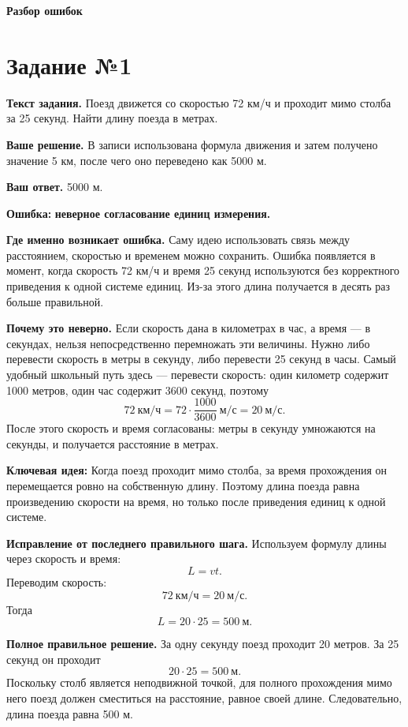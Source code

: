 \documentclass[12pt,a4paper]{article}
\newcommand{\errorlabel}[1]{\textcolor{errred}{\textbf{Ошибка:}} \textbf{#1}}
\newcommand{\keyidea}[1]{\textcolor{ideablue}{\textbf{Ключевая идея:}} #1}
\begin{document}
\newpage
\vspace*{0.35\textheight}
\begin{center}
{\LARGE\bfseries Разбор ошибок}
\end{center}
\newpage

\label{task:1}
\section*{Задание №1}
\textbf{Текст задания.} Поезд движется со скоростью 72 км/ч и проходит мимо столба за 25 секунд. Найти длину поезда в метрах.

\textbf{Ваше решение.} В записи использована формула движения и затем получено значение 5 км, после чего оно переведено как 5000 м.

\textbf{Ваш ответ.} 5000 м.

\errorlabel{неверное согласование единиц измерения.}

\textbf{Где именно возникает ошибка.} Саму идею использовать связь между расстоянием, скоростью и временем можно сохранить. Ошибка появляется в момент, когда скорость 72 км/ч и время 25 секунд используются без корректного приведения к одной системе единиц. Из-за этого длина получается в десять раз больше правильной.

\textbf{Почему это неверно.} Если скорость дана в километрах в час, а время --- в секундах, нельзя непосредственно перемножать эти величины. Нужно либо перевести скорость в метры в секунду, либо перевести 25 секунд в часы. Самый удобный школьный путь здесь --- перевести скорость: один километр содержит 1000 метров, один час содержит 3600 секунд, поэтому
\[
72\ \text{км/ч}=72\cdot\frac{1000}{3600}\ \text{м/с}=20\ \text{м/с}.
\]
После этого скорость и время согласованы: метры в секунду умножаются на секунды, и получается расстояние в метрах.

\keyidea{Когда поезд проходит мимо столба, за время прохождения он перемещается ровно на собственную длину. Поэтому длина поезда равна произведению скорости на время, но только после приведения единиц к одной системе.}

\textbf{Исправление от последнего правильного шага.} Используем формулу длины через скорость и время:
\[
L=vt.
\]
Переводим скорость:
\[
72\ \text{км/ч}=20\ \text{м/с}.
\]
Тогда
\[
L=20\cdot25=500\ \text{м}.
\]

\textbf{Полное правильное решение.} За одну секунду поезд проходит 20 метров. За 25 секунд он проходит
\[
20\cdot25=500\ \text{м}.
\]
Поскольку столб является неподвижной точкой, для полного прохождения мимо него поезд должен сместиться на расстояние, равное своей длине. Следовательно, длина поезда равна 500 м.
\end{document}
